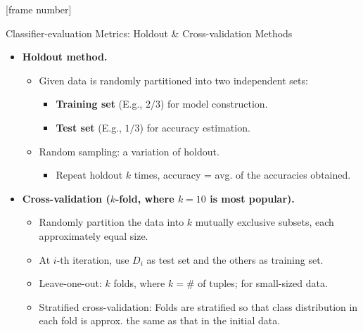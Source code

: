 \documentclass[aspectratio=169,t,table]{beamer}
\begin{document}
  {
    [frame number]
    \begin{frame}{Classifier-evaluation Metrics: Holdout \& Cross-validation Methods}
      \begin{itemize}
        \item \textbf{Holdout method.}
        \begin{itemize}
          \item Given data is randomly partitioned into two independent sets:
          \begin{itemize}
            \item \textbf{\color{airforceblue}Training set} (E.g., $2/3$) for model construction.
            \item \textbf{\color{airforceblue}Test set} (E.g., $1/3$) for accuracy estimation.
          \end{itemize}
          \item Random sampling: a variation of holdout.
          \begin{itemize}
            \item Repeat holdout $k$ times, accuracy = avg. of the accuracies obtained.
          \end{itemize}
        \end{itemize}
        \item \textbf{{\color{airforceblue}Cross-validation} ($k$-fold, where $k = 10$ is most popular).}
        \begin{itemize}
          \item Randomly partition the data into $k$ mutually exclusive subsets, each approximately equal size.
          \item At $i$-th iteration, use $D_i$ as test set and the others as training set.
          \item Leave-one-out: $k$ folds, where $k = \#$ of tuples; for small-sized data.
          \item Stratified cross-validation: Folds are stratified so that class distribution in each fold is approx. the same as that in the initial data.
        \end{itemize}
      \end{itemize}
    \end{frame}
  }
\end{document}
